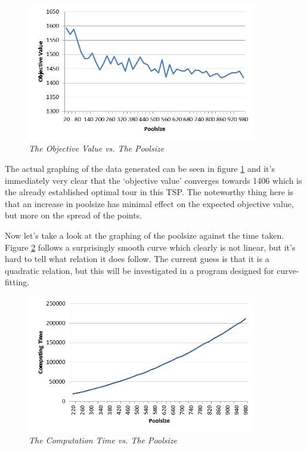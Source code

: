 \begin{figure}[h] 
\centering
\includegraphics[height=6cm]{OVP}
\caption{\textsl{The Objective Value vs. The Poolsize}}
\label{OVP}
\end{figure}

The actual graphing of the data generated can be seen in figure \ref{OVP} and it’s immediately very clear that the ‘objective value’ converges towards 1406 which is the already established optimal tour in this TSP. The noteworthy thing here is that an increase in poolsize has minimal effect on the expected objective value, but more on the spread of the points.




\par
Now let’s take a look at the graphing of the poolsize against the time taken. 
Figure \ref{CTP} follows a surprisingly smooth curve which clearly is not linear, but it’s hard to tell what relation it does follow. The current guess is that it is a quadratic relation, but this will be investigated in a program designed for curve-fitting.

\begin{figure}[h] 
	\centering
	\includegraphics[height=6cm]{CTP}
	\caption{\textsl{The Computation Time vs. The Poolsize}}
	\label{CTP}
\end{figure}



